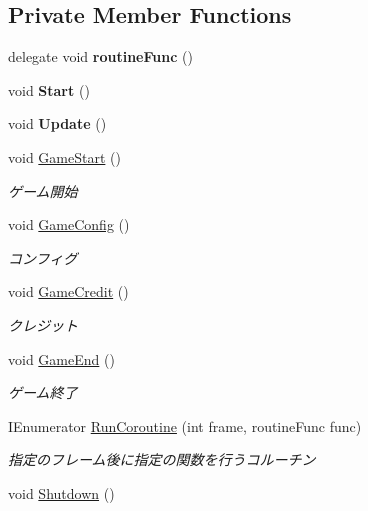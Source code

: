 \subsection*{Private Member Functions}
\begin{DoxyCompactItemize}
\item 
\mbox{\label{class_title_ad1b79b2803d7053d8369e59c012a91c3}} 
delegate void {\bfseries routine\+Func} ()
\item 
\mbox{\label{class_title_adb21c32bc899c57bcafc29adcdf766c3}} 
void {\bfseries Start} ()
\item 
\mbox{\label{class_title_ad0d94dc5c7c78d3acc72cd84e84801dc}} 
void {\bfseries Update} ()
\item 
void \hyperlink{class_title_aad4ba589818e3ad8b1794ff6a2785efa}{Game\+Start} ()
\begin{DoxyCompactList}\small\item\em ゲーム開始 \end{DoxyCompactList}\item 
void \hyperlink{class_title_a8575b965680aab2b77361fbbe39153fb}{Game\+Config} ()
\begin{DoxyCompactList}\small\item\em コンフィグ \end{DoxyCompactList}\item 
void \hyperlink{class_title_a93b0e5587f2db785591511b3e2287a5a}{Game\+Credit} ()
\begin{DoxyCompactList}\small\item\em クレジット \end{DoxyCompactList}\item 
void \hyperlink{class_title_af1a7258248297b2f84aea9fd3239e4e2}{Game\+End} ()
\begin{DoxyCompactList}\small\item\em ゲーム終了 \end{DoxyCompactList}\item 
I\+Enumerator \hyperlink{class_title_aa13451685d7894235cd8fa7ff8a3c139}{Run\+Coroutine} (int frame, routine\+Func func)
\begin{DoxyCompactList}\small\item\em 指定のフレーム後に指定の関数を行うコルーチン \end{DoxyCompactList}\item 
void \hyperlink{class_title_a7b7aeb60856a00d9b0bb201bed2bc878}{Shutdown} ()

\end{DoxyCompactItemize}
